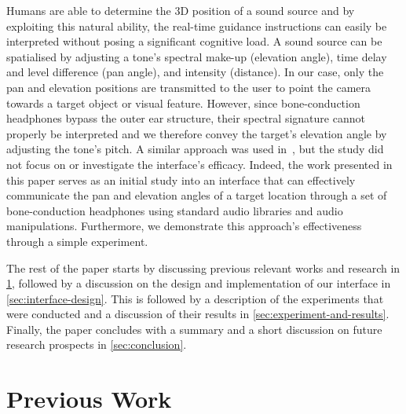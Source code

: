\documentclass{llncs}
\begin{document}
Humans are able to determine the 3D position of a sound source and by exploiting this natural ability, the real-time guidance instructions can easily be interpreted without posing a significant cognitive load.
A sound source can be spatialised by adjusting a tone's spectral make-up (elevation angle), time delay and level difference (pan angle), and intensity (distance).
In our case, only the pan and elevation positions are transmitted to the user to point the camera towards a target object or visual feature.
However, since bone-conduction headphones bypass the outer ear structure, their spectral signature cannot properly be interpreted and we therefore convey the target's elevation angle by adjusting the tone's pitch.
A similar approach was used in~\cite{durette2008visuo}, but the study did not focus on or investigate the interface's efficacy.
Indeed, the work presented in this paper serves as an initial study into an interface that can effectively communicate the pan and elevation angles of a target location through a set of bone-conduction headphones using standard audio libraries and audio manipulations.
Furthermore, we demonstrate this approach's effectiveness through a simple experiment.

The rest of the paper starts by discussing previous relevant works and research in \cref{sec:prev-work}, followed by a discussion on the design and implementation of our interface in \cref{sec:interface-design}.
This is followed by a description of the experiments that were conducted and a discussion of their results in \cref{sec:experiment-and-results}.
Finally, the paper concludes with a summary and a short discussion on future research prospects in \cref{sec:conclusion}.

\section{Previous Work}\label{sec:prev-work}
\end{document}
